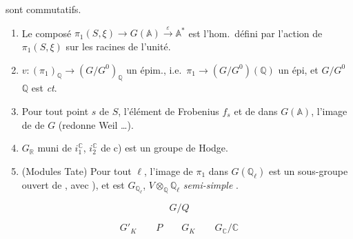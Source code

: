 \documentclass[11pt,a4paper]{article}
\begin{document}


sont commutatifs.

\begin{enumerate}
  \item[5)] Le composé
  $\pi_{1}(S, \xi) \longrightarrow G(\mathbb{A}) \xrightarrow{\ \varepsilon\ } \mathbb{A}^{*}$
  est l'hom.\ défini par l'action de $\pi_{1}(S, \xi)$ sur les racines de
  l'unité.
  \item[6)] $v : (\pi_{1})_{\mathbb{Q}} \longrightarrow (G/G^{0})_{\mathbb{Q}}$
  un épim., i.e.\ $\pi_{1} \to (G/G^{0})(\mathbb{Q})$ un épi, et
  $G/G^{0}$ \ill{} $\mathbb{Q}$ est \emph{ct}.
  \item[7)] Pour tout point \ill{} $s$ de $S$, l'élément de Frobenius $f_{s}$ et
  \ill{} de \ill{} \ill{} dans $G(\mathbb{A})$, l'image de \ill{}
  \struck{\ill{}} de $G$ (redonne Weil \ldots).
  \item[8)] $G_{\mathbb{R}}$ muni de $i^{\mathbb{C}}_{1}$, $i^{\mathbb{C}}_{2}$
  de c) est \ill{} un groupe de Hodge.
  \item[9)] (Modules Tate) Pour tout $\ell$, l'image de $\pi_{1}$ dans
  $G(\mathbb{Q}_{\ell})$ est un sous-groupe ouvert de \struck{\ill{}}
  \ill{} \struck{\ill{}}, avec ), et \ill{}
  est $G_{\mathbb{Q}_{\ell}}$, \ill{} $V \otimes_{\mathbb{Q}} \mathbb{Q}_{\ell}$
  \ill{} \emph{semi-simple} \ill{}.
\end{enumerate}


\struck{\ill{}}


\[ G/Q \]

\[ G'_{K} \qquad P \qquad G_{K} \qquad G_{\mathbb{C}}/\mathbb{C} \]

\end{document}
